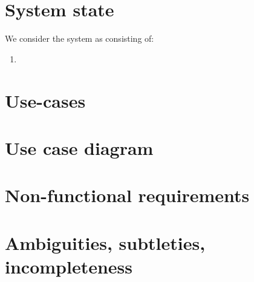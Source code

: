 \documentclass{article}
\begin{document}
\section{System state}
We consider the system as consisting of:
\begin{enumerate}
\item
\end{enumerate}
\section{Use-cases}

\section{Use case diagram}

\section{Non-functional requirements}

\section{Ambiguities, subtleties, incompleteness}
\end{document}

